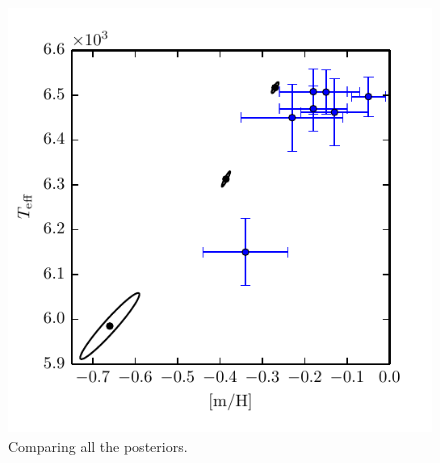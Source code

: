 \documentclass[iop,floatfix]{emulateapj}
\begin{document}
\begin{figure}[!htb]
\begin{center}
\includegraphics{figs/metacomparison.pdf}
\caption{Comparing all the posteriors.}
\label{fig:metacomparison}
\end{center}
\end{figure}
\end{document}

